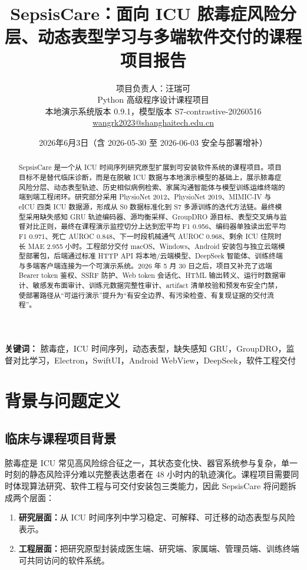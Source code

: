 \documentclass[11pt,a4paper]{article}
\title{SepsisCare：面向 ICU 脓毒症风险分层、动态表型学习与多端软件交付的课程项目报告}
\author{项目负责人：汪瑞可\\
Python 高级程序设计课程项目\\
本地演示系统版本 0.9.1，模型版本 S7-contrastive-20260516\\
\href{mailto:wangrk2023@shanghaitech.edu.cn}{wangrk2023@shanghaitech.edu.cn}}
\date{2026年6月3日（含 2026-05-30 至 2026-06-03 安全与部署增补）}
\begin{document}
\maketitle

\begin{abstract}
SepsisCare 是一个从 ICU 时间序列研究原型扩展到可安装软件系统的课程项目。项目目标不是替代临床诊断，而是在脱敏 ICU 数据与本地演示模型的基础上，展示脓毒症风险分层、动态表型轨迹、历史相似病例检索、家属沟通智能体与模型训练运维终端的端到端工程闭环。研究部分采用 PhysioNet 2012、PhysioNet 2019、MIMIC-IV 与 eICU 四类 ICU 数据源，形成从 S0 数据标准化到 S7 多源训练的迭代方法链。最终模型采用缺失感知 GRU 轨迹编码器、源均衡采样、GroupDRO 源目标、表型交叉熵与监督对比正则，最终在课程演示监控切分上达到宏平均 F1 0.956、编码器单独读出宏平均 F1 0.971、死亡 AUROC 0.848、下一时段机械通气 AUROC 0.968、剩余 ICU 住院时长 MAE 2.955 小时。工程部分交付 macOS、Windows、Android 安装包与独立云端模型部署包，后端通过标准 HTTP API 将本地/云端模型、DeepSeek 智能体、训练终端与多端客户端连接为一个可演示系统。2026 年 5 月 30 日之后，项目又补充了远端 Bearer token 鉴权、SSRF 防护、Web token 会话化、HTML 输出转义、运行时数据审计、敏感发布面审计、训练元数据完整性审计、artifact 清单校验和预发布安全门禁，使部署路径从“可运行演示”提升为“有安全边界、有污染检查、有复现证据的交付流程”。
\end{abstract}

\noindent\textbf{关键词：}
脓毒症，ICU 时间序列，动态表型，缺失感知 GRU，GroupDRO，监督对比学习，Electron，SwiftUI，Android WebView，DeepSeek，软件工程交付

\section{背景与问题定义}
\subsection{临床与课程项目背景}
脓毒症是 ICU 常见高风险综合征之一，其状态变化快、器官系统参与复杂，单一时刻的静态风险评分难以完整表达患者在 48 小时内的轨迹演化。课程项目需要同时体现算法研究、软件工程与可交付安装包三类能力，因此 SepsisCare 将问题拆成两个层面：
\begin{enumerate}[leftmargin=*,itemsep=1pt]
  \item \textbf{研究层面：}从 ICU 时间序列中学习稳定、可解释、可迁移的动态表型与风险表示。
  \item \textbf{工程层面：}把研究原型封装成医生端、研究端、家属端、管理员端、训练终端可共同访问的软件系统。
\end{enumerate}
\end{document}
